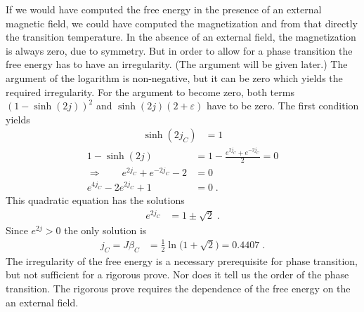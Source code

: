 If we would have computed the free energy in the presence of an external magnetic field,
we could have computed the magnetization  and from that directly the transition temperature. 
In the absence of an external field, the magnetization is always zero, due to symmetry.
But in order to allow for a  phase transition the free energy has to have an irregularity.
(The argument will be given later.)
The argument of the logarithm is non-negative, but it can be zero which yields the required irregularity.
For the argument to become zero, both terms $(1-\sinh(2j))^{2}$ and $\sinh(2j)(2+\varepsilon)$ have to be zero.
The first condition yields
%
\begin{align}\label{eq:jC:2d:ising}
\sinh(2 j_{C}) &=1 
\end{align}
%
%
\begin{align*}
1 -\sinh(2j) &=  1 - \frac{e^{2j_{C}}+e^{-2j_{C}}}{2} = 0\\
\Rightarrow\qquad e^{2j_{C}}+e^{-2j_{C}} -2 &=0\\
e^{4j_{C}} -2 e^{2j_{C}} + 1&=0\;.
\end{align*}
%
This quadratic equation has the solutions
%
\begin{align*}
e^{2j_{C}} &= 1 \pm\sqrt{2}\;.
\end{align*}
%
Since $e^{2j}>0$ the only solution is 
%
\begin{align}\label{eq:}
j_{C} = J \beta_{C} &= \frac{1}{2}\ln\big( 1+\sqrt{2} \big) = 0.4407\;.
\end{align}
%
The irregularity  of the free energy is a necessary prerequisite for phase transition, but not 
sufficient for a rigorous prove. Nor does it tell us the order of the phase transition.
The rigorous prove requires the dependence of the free energy on the an external field.
\newpage

